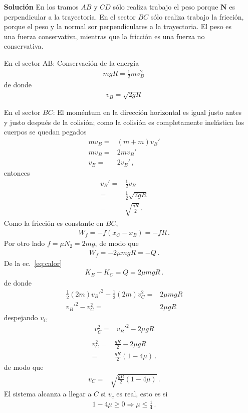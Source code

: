 \begin{itemize}
\item[\textbf{Solución}] 
En los tramos $AB$ y $CD$ sólo realiza trabajo el peso porque
$\mathbf{N}$ es perpendicular a la trayectoria. En el sector $BC$ sólo
realiza trabajo la fricción, porque el peso y la normal sor
perpendiculares a la trayectoria. El peso es una fuerza conservativa,
mientras que la fricción es una fuerza no conservativa.



En el sector AB: Conservación de la energía
\begin{align}
  mgR=\tfrac{1}{2}m v^2_B\,
\end{align}
de donde
\begin{align}
  v_B=\sqrt{2gR}
\end{align}

En el sector $BC$: El moméntum en la dirección horizontal es igual justo
antes y justo después de la colisión; como la colisión es
completamente inelástica los cuerpos se quedan pegados
\begin{align}
  m v_B=&(m+m) v_B'\nonumber\\
  m v_B=&2m v_B'\nonumber\\
   v_B=&2v_B'\,,
\end{align}
entonces
\begin{align}
  v_B'=&\tfrac{1}{2}v_B\nonumber\\
  =&\tfrac{1}{2}\sqrt{2gR}\nonumber\\
  =&\sqrt{\frac{gR}{2}}\,.
\end{align}
Como la fricción es constante en $BC$,
\begin{align}
  W_f=-f(x_C-x_B)=-f R\,.
\end{align}
Por otro lado $f=\mu N_2=2 m g$, de modo que
\begin{align}
  W_f=-2 \mu m g R=-Q\,.
\end{align}
De la ec.~\eqref{eq:calor}
\begin{align}
  K_B-K_C=Q=2\mu m g R\,.
\end{align}
de donde
\begin{align}
  \tfrac{1}{2}(2m){v_B'}^2-  \tfrac{1}{2}(2m)v_C^2=&2\mu m g R\nonumber\\
  {v_B'}^2- v_C^2=&2\mu  g R
\end{align}
despejando $v_C$
\begin{align}
   v_C^2=&{v_B'}^2-2\mu g R\nonumber\\
\end{align}
\begin{align}
  v_C^2=&\frac{gR}{2}-2\mu g R\nonumber\\
  =&\frac{gR}{2}\left(1-4\mu \right)\,.
\end{align}
de modo que
\begin{align}
  v_C=&\sqrt{\frac{gR}{2}\left(1-4\mu \right)}\,.
\end{align}
El sistema alcanza a llegar a $C$ si $v_c$ es real, esto es si
\begin{align}
  1-4\mu\ge 0\Longrightarrow \mu\le \frac{1}{4}\,.
\end{align}


\end{itemize}
